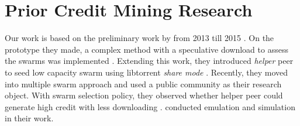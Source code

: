 



%



\section{Prior Credit Mining Research}
\label{section:cmprior}
Our work is based on the preliminary work by \citeauthor{2015:creditmining:capota} from 2013 till 2015 \cite{2015:creditmining:capota, 2013:investmentcm:capota, 2014:bwmarket:capota}. On the prototype they made, a complex method with a speculative download to assess the swarms was implemented \cite{2013:investmentcm:capota}. Extending this work, they introduced \textit{helper} peer to seed low capacity swarm using libtorrent \textit{share mode} \cite{2014:bwmarket:capota}. Recently, they moved into multiple swarm approach and used a public community as their research object. With swarm selection policy, they observed whether helper peer could generate high credit with less downloading \cite{2015:creditmining:capota}. \citeauthor{2015:creditmining:capota} conducted emulation and simulation in their work.

